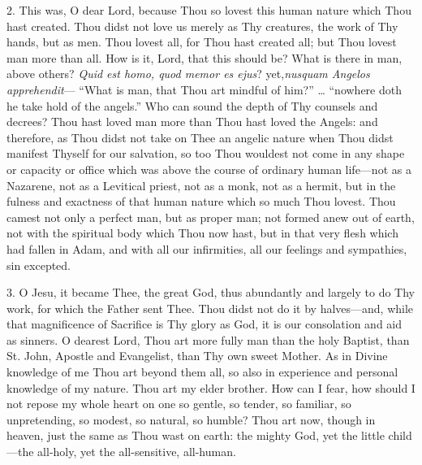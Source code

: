 2. This was, O dear Lord,
because Thou so lovest this human nature which Thou hast created. Thou
didst not love us merely as Thy creatures, the work of Thy hands, but as
men. Thou lovest all, for Thou hast created all; but Thou lovest man
more than all. How is it, Lord, that this should be? What is there
in man, above others? \emph{Quid est homo, quod memor es ejus}? yet,\emph{nusquam Angelos apprehendit}— ``What is man, that Thou art mindful
of him?'' … ``nowhere doth he take hold of the angels.'' Who can sound
the depth of Thy counsels and decrees? Thou hast loved man more than
Thou hast loved the Angels: and therefore, as Thou didst not take on
Thee an angelic nature when Thou didst manifest Thyself for our
salvation, so too Thou wouldest not come in any shape or capacity or
office which was above the course of ordinary human life—not as a
Nazarene, not as a Levitical priest, not as a monk, not as a hermit, but
in the fulness and exactness of that human nature which so much Thou
lovest. Thou camest not only a perfect man, but as proper man; not
formed anew out of earth, not with the spiritual body which Thou now
hast, but in that very flesh which had fallen in Adam, and with all our
infirmities, all our feelings and sympathies, sin excepted.

3. O Jesu, it became Thee, the
great God, thus abundantly and largely to do Thy work, for which the
Father sent Thee. Thou didst not do it by halves—and, while that
magnificence of Sacrifice is Thy glory as God, it is our consolation and
aid as sinners. O dearest Lord, Thou art more fully man than the holy
Baptist, than St. John, Apostle and Evangelist, than Thy own sweet
Mother. As in Divine knowledge of me Thou art beyond them all, so also
in experience and personal knowledge of my nature. Thou art my elder
brother. How can I fear, how should I not repose my whole heart on
one so gentle, so tender, so familiar, so unpretending, so modest, so
natural, so humble? Thou art now, though in heaven, just the same as
Thou wast on earth: the mighty God, yet the little child—the all-holy,
yet the all-sensitive, all-human.


